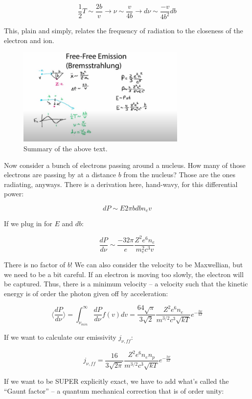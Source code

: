 \documentclass{article}
\begin{document}
$$
\frac12 T \sim \frac{2b}{v} \rightarrow \nu \sim \frac{v}{4b} \rightarrow d\nu \sim \frac{-v}{4b^2} db
$$

This, plain and simply, relates the frequency of radiation to the closeness of the electron and ion. 

\begin{figure}
    \centering
    \includegraphics[width=0.74\textwidth]{figures/Screen Shot 2020-10-11 at 11.54.09 PM.png}
    \caption{Summary of the above text.}
    \label{fig:summmm2m2m}
\end{figure}

Now consider a bunch of electrons passing around a nucleus. How many of those electrons are passing by at a distance $b$ from the nucleus? Those are the ones radiating, anyways. There is a derivation here, hand-wavy, for this differential power:

$$
dP \sim E 2\pi b db n_e v
$$

If we plug in for $E$ and $db$:

$$
\frac{dP }{d\nu} \sim \frac{-32\pi}{e} \frac{Z^2 e^6 n_e}{m_e^2 c^3 v}
$$

There is no factor of $b$! We can also consider the velocity to be Maxwellian, but we need to be a bit careful. If an electron is moving too slowly, the electron will be captured. Thus, there is a minimum velocity -- a velocity such that the kinetic energy is of order the photon given off by acceleration:

$$
\boxed{\langle\frac{dP}{d\nu}\rangle = \int_{\nu_{min}}^{\infty} \frac{dP}{d\nu} f(v) dv = \frac{64 \sqrt{\pi}}{3\sqrt{2}} \frac{Z^2 e^6 n_e}{m^{3/2} c^3 \sqrt{kT}} e^{-\frac{h\nu}{kT}}}
$$

If we want to calculate our emissivity $j_{\nu,ff}$:

$$
\boxed{j_{\nu,ff} = \frac{16}{3\sqrt{2\pi}} \frac{Z^2 e^6 n_e n_p}{m^{3/2} c^3 \sqrt{kT}} e^{-\frac{h\nu}{kT}}}
$$

If we want to be SUPER explicitly exact, we have to add what's called the ``Gaunt factor'' -- a quantum mechanical correction that is of order unity:
\end{document}
